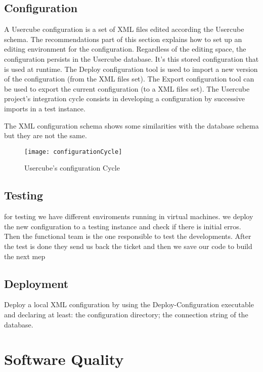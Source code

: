\subsection{Configuration}
\label{sec:Template}

A Usercube configuration is a set of XML files edited according the Usercube schema. The recommendations part of this section explains how to set up an editing environment for the configuration. Regardless of the editing space, the configuration persists in the Usercube database. It's this stored configuration that is used at runtime. The Deploy configuration tool is used to import a new version of the configuration (from the XML files set). The Export configuration tool can be used to export the current configuration (to a XML files set). The Usercube project's integration cycle consists in developing a configuration by successive imports in a test instance.

The XML configuration schema shows some similarities with the database schema but they are not the same.

\begin{figure}[htbp]
  \centering
  \texttt{[image: configurationCycle]}
  \caption{Usercube's configuration Cycle}
  \label{fig:configurationCycle}
\end{figure}

\subsection{Testing}
\label{sec:Template}

for testing we have different enviroments running in virtual machines. we deploy the new configuration to a testing instance and check if there is initial erros. Then the functional team is the one responsible to test the developments. After the test is done they send us back the ticket and then we save our code to build the next mep

\subsection{Deployment}
\label{sec:Template}

Deploy a local XML configuration by using the Deploy-Configuration executable and declaring at least: the configuration directory; the connection string of the database.

\section{Software Quality}
\label{sec:Template}

